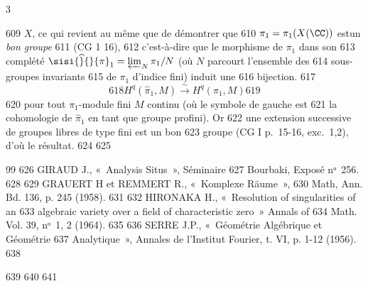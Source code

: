 3	\documentclass[10pt]{../fichiers-configuration-latex/smfart}
\begin{document}
   609	$X$, ce qui revient au même que de démontrer que
   610	$\pi_1=\pi_1(X(\CC))$ est\pageoriginale un \emph{bon groupe}
   611	(\cf CG 1 16), %
   612	 c'est-à-dire que le morphisme de $\pi_1$ dans son
   613	complété $\sisi{\widehat}{}{\pi}_1=\varprojlim_N \pi_1/N$ (où $N$ parcourt l'ensemble des
   614	sous-groupes invariants %
   615	de $\pi_1$ d'indice fini) induit une
   616	bijection.
   617	$$
   618	H^q(\widehat{\pi}_1,M)\xrightarrow{\sim} H^q(\pi_1,M)
   619	$$
   620	pour tout $\pi_1$-module fini $M$ continu (où le symbole de gauche est
   621	la cohomologie de $\widehat{\pi}_1$ en tant que groupe profini). Or
   622	une extension successive de groupes libres de type fini est un bon
   623	groupe (\cf CG I p.~15-16, exc.~1,2), d'où le résultat. %
   624	
   625	\begin{thebibliography}{99}
   626	 GIRAUD J., « Analysis Situs », Séminaire
   627	Bourbaki, Exposé nᵒ 256.
   628	
   629	 GRAUERT H et REMMERT R., « Komplexe Räume »,
   630	Math, Ann. Bd. 136, p. 245 (1958).
   631	
   632	 HIRONAKA H., « Resolution of singularities of an
   633	algebraic variety over a field of characteristic zero » Annals of
   634	Math. Vol. 39, nᵒ 1, 2 (1964).
   635	
   636	 SERRE J.P., « Géométrie Algébrique et Géométrie
   637	Analytique », Annales de l'Institut Fourier, t. VI, p. 1-12 (1956).
   638	\end{thebibliography}
   639	
   640	
   641	\ifx\danslelivre{}	
\end{document}
